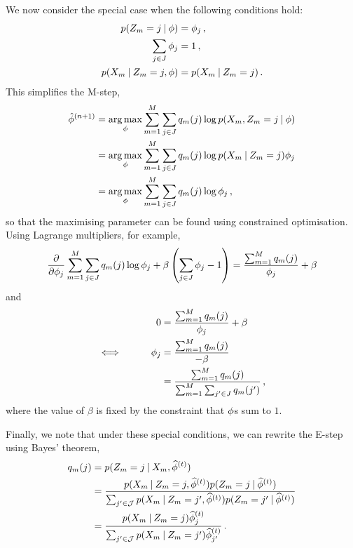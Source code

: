 We now consider the special case when the following conditions hold:
%
\begin{align}
    \prob(\ct[m] = j \given \sfs) &= \sfs_j \label{eq:latentisparameter} \, , \\
    \sum_{j \in J} \sfs_j &= 1 \label{eq:parametersumstoone} \, , \\
    \prob(\data[m] \given \ct[m] = j, \sfs) &= \prob(\data[m] \given \ct[m] = j) \label{eq:conditionalindependenceofparameter} \, .
\end{align}
%
This simplifies the M-step,
%
\begin{align}
    \hat{\sfs}^{(n + 1)} 
    &= \argmax_\sfs \sum_{m = 1}^M \sum_{j \in J} q_m(j) \log \prob(\data[m], \ct[m] = j \given \sfs) \nonumber \\
    &= \argmax_\sfs \sum_{m = 1}^M \sum_{j \in J} q_m(j) \log \prob(\data[m] \given \ct[m] = j) \sfs_j \nonumber \\
    &= \argmax_\sfs \sum_{m = 1}^M \sum_{j \in J} q_m(j) \log \sfs_j \, ,
\end{align}
%
so that the maximising parameter can be found using constrained optimisation. Using Lagrange multipliers, for example,
%
\begin{equation}
    \frac{\partial}{\partial \phi_j} \sum_{m = 1}^M \sum_{j \in J} q_m(j) \log \phi_j + \beta \left( \sum_{j \in J} \phi_j - 1 \right)
    = \frac{\sum_{m = 1}^M q_m(j)}{\phi_j} + \beta
\end{equation}
%
and
%
\begin{alignat}{2}\label{eq:generalmstep}
    &\qquad& 
    0 &= \frac{\sum_{m = 1}^M q_m(j)}{\phi_j} + \beta \nonumber \\
    \iff && \phi_j &= \frac{\sum_{m = 1}^M q_m(j)}{-\beta} \nonumber \\
         && &= \frac{\sum_{m = 1}^M q_m(j)}{\sum_{m = 1}^M \sum_{j' \in J} q_m(j')} \, , 
\end{alignat}
%
where the value of $\beta$ is fixed by the constraint that $\phi$s sum to $1$.

Finally, we note that under these special conditions, we can rewrite the E-step using Bayes' theorem,
%
\begin{align}\label{eq:generalestep}
    q_m(j)
    &= \prob(\ct[m] = j \given \data[m], \estsfs[t]) \nonumber \\
    &= \frac{
        \prob(\data[m] \given \ct[m] = j, \estsfs[t]) \prob(\ct[m] = j \given \estsfs[t])
    }{
        \sum_{j' \in \ctset} \prob(\data[m] \given \ct[m] = j', \estsfs[t]) \prob(\ct[m] = j' \given \estsfs[t])
    } \nonumber \\
    &= \frac{
        \prob(\data[m] \given \ct[m] = j) \estsfs[t]_j
    }{
        \sum_{j' \in \ctset} \prob(\data[m] \given \ct[m] = j') \estsfs[t]_{j'}
    } \, .
\end{align}

